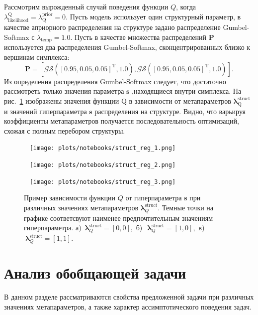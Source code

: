 \begin{example} 
Рассмотрим вырожденный случай поведения функции $Q$, когда $\lambda_\text{likelihood}^\text{Q} = \lambda^\text{prior}_\text{Q} = 0$. Пусть модель использует один структурный параметр, в качестве априорного распределения на структуре задано распределение Gumbel-Softmax с $\lambda_\text{temp}=1.0$. Пусть в качестве множества распределений $\mathbf{P}$ используется два распределения Gumbel-Softmax, сконцентрированных близко к вершинам симплекса:
\[
    \mathbf{P} = [\mathcal{GS}([0.95, 0.05, 0.05]^\text{T}, 1.0) ,\mathcal{GS}([0.95, 0.05, 0.05]^\text{T}, 1.0)].
\]
Из определения распределения Gumbel-Softmax следует, что достаточно рассмотреть только значения параметра $\mathbf{s}$ ,находящиеся внутри симплекса.
На рис.~\ref{fig:gs_comb} изображены значения функции Q в зависимости от метапараметров $\boldsymbol{\lambda}^\text{struct}_\text{Q}$ и значений гиперпараметра $\mathbf{s}$ распределения на структуре. Видно, что варьируя  коэффициенты метапараметров получается последовательность оптимизаций, схожая с полным перебором структуры.
\end{example}


\begin{figure}
 \begin{minipage}[t]{.32\textwidth}
   \texttt{[image: plots/notebooks/struct\_reg\_1.png]}
\subcaption{}
\end{minipage}
\hfill
 \begin{minipage}[t]{.32\textwidth}
   \texttt{[image: plots/notebooks/struct\_reg\_2.png]}
\subcaption{}
\end{minipage}
\hfill
 \begin{minipage}[t]{.32\textwidth}
   \texttt{[image: plots/notebooks/struct\_reg\_3.png]}
\subcaption{}
\end{minipage}

\caption{Пример зависимости функции $Q$ от гиперпараметра $\mathbf{s}$ при различных значениях метапараметров $\boldsymbol{\lambda}^\text{struct}_Q$. Темные точки на графике соответсвуют наименее предпочтительным значениям гиперпараметра. а)~$\boldsymbol{\lambda}^\text{struct}_Q = [0,0],$ б)~$~\boldsymbol{\lambda}^\text{struct}_Q = [1,0],$ в)~$~\boldsymbol{\lambda}^\text{struct}_Q = [1,1].$}
\label{fig:gs_comb}

\end{figure}

\section{Анализ обобщающей задачи}
В данном разделе рассматриваются свойства предложенной задачи при различных значениях метапараметров, а также характер ассимптотического поведения задач.


